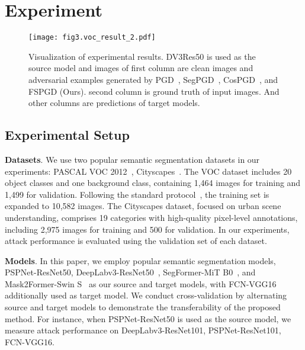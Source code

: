 \section{Experiment}
\label{sec4:experiment}
\begin{figure*}
\centering
\texttt{[image: fig3.voc\_result\_2.pdf]}
\caption{Visualization of experimental results. DV3Res50 is used as the source model and images of first column are clean images and adversarial examples generated by PGD~\cite{mkadry2017towards}, SegPGD~\cite{gu2022segpgd}, CosPGD~\cite{agnihotri2024cospgd}, and FSPGD (Ours). second column is ground truth of input images. And other columns are predictions of target models. }
\label{fig:visual}
\end{figure*}

\subsection{Experimental Setup}
\label{sec4.1:Experimental Setup}
\textbf{Datasets}. We use two popular semantic segmentation datasets in our experiments: PASCAL VOC 2012~\cite{pascal-voc-2012}, Cityscapes~\cite{cordts2016cityscapes}. The VOC dataset includes 20 object classes and one background class, containing 1,464 images for training and 1,499 for validation. Following the standard protocol~\cite{hariharan2015hypercolumns}, the training set is expanded to 10,582 images. The Cityscapes dataset, focused on urban scene understanding, comprises 19 categories with high-quality pixel-level annotations, including 2,975 images for training and 500 for validation. In our experiments, attack performance is evaluated using the validation set of each dataset.


\noindent
\textbf{Models}. In this paper, we employ popular semantic segmentation models, \ie PSPNet-ResNet50, DeepLabv3-ResNet50~\cite{chen2017rethinking}, SegFormer-MiT B0~\cite{xie2021segformer}, and Mask2Former-Swin S~\cite{cheng2022masked} as our source and target models, with FCN-VGG16~\cite{long2015fully} additionally used as target model. We conduct cross-validation by alternating source and target models to demonstrate the transferability of the proposed method. For instance, when PSPNet-ResNet50 is used as the source model, we measure attack performance on DeepLabv3-ResNet101, PSPNet-ResNet101, FCN-VGG16.

